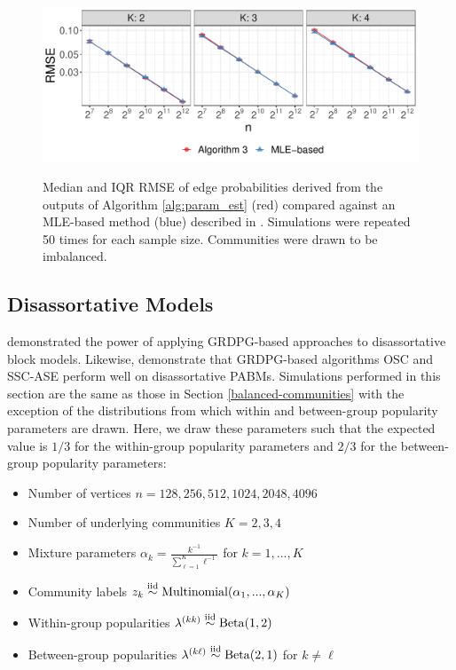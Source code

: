 \documentclass[12pt]{article}
\providecommand{\tightlist}{%
  \setlength{\itemsep}{0pt}\setlength{\parskip}{0pt}}
\begin{document}
\begin{figure}[H]
{\centering \includegraphics{summary_files/figure-latex/lambda_est_p_imba-1}
}
\caption{Median and IQR RMSE of edge probabilities derived from the
  outputs of Algorithm \ref{alg:param_est} (red) compared against an
  MLE-based method (blue) described in
  \cite{307cbeb9b1be48299388437423d94bf1}.
  Simulations were repeated 50 times for each sample size. Communities were drawn to be imbalanced.}
\label{fig:lambda_est_p_imba}
\end{figure}

\hypertarget{disassortative-models}{%
\subsection{Disassortative Models}\label{disassortative-models}}

\citet{rubindelanchy2017statistical} demonstrated the power of applying GRDPG-based approaches to disassortative block models. 
Likewise, demonstrate that GRDPG-based algorithms OSC and SSC-ASE perform well on disassortative PABMs. 
Simulations performed in this section are the same as those in Section \ref{balanced-communities} 
with the exception of the distributions from which within and between-group popularity parameters are drawn. 
Here, we draw these parameters such that the expected value is $1/3$ for the within-group popularity parameters 
and $2/3$ for the between-group popularity parameters:

\begin{itemize}
\tightlist
\item
  Number of vertices \(n = 128, 256, 512, 1024, 2048, 4096\)
\item
  Number of underlying communities \(K = 2, 3, 4\)
\item
  Mixture parameters \(\alpha_k = \frac{k^{-1}}{\sum_{\ell=1}^K \ell^{-1}}\)
  for \(k = 1, ..., K\)
\item
  Community labels
  \(z_k \stackrel{\text{iid}}{\sim} \mathrm{Multinomial}(\alpha_1, ..., \alpha_K)\)
\item
  Within-group popularities
  \(\lambda^{(kk)} \stackrel{\text{iid}}{\sim} \mathrm{Beta}(1, 2)\)
\item
  Between-group popularities
  \(\lambda^{(k \ell)} \stackrel{\text{iid}}{\sim} \mathrm{Beta}(2, 1)\) for
  \(k \neq \ell\)
\end{itemize}
\end{document}
